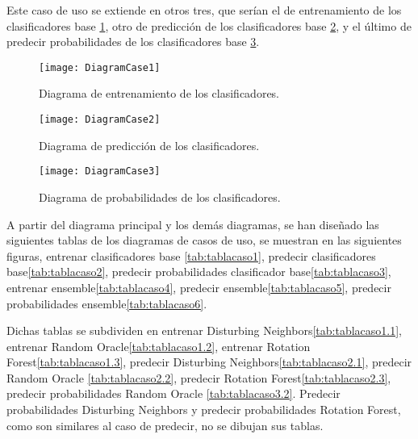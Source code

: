 Este caso de uso se extiende en otros tres, que serían el de entrenamiento de los clasificadores base \ref{fig:DiagramCase1}, otro de predicción de los clasificadores base \ref{fig:DiagramCase2}, y el último de predecir probabilidades de los clasificadores base \ref{fig:DiagramCase3}.	

\begin{figure}
\centering
\texttt{[image: DiagramCase1]}
\caption{Diagrama de entrenamiento de los clasificadores.}
\label{fig:DiagramCase1}
\end{figure}

\begin{figure}
\centering
\texttt{[image: DiagramCase2]}
\caption{Diagrama de predicción de los clasificadores.}
\label{fig:DiagramCase2}
\end{figure}

\begin{figure}
\centering
\texttt{[image: DiagramCase3]}
\caption{Diagrama de probabilidades de los clasificadores.}
\label{fig:DiagramCase3}
\end{figure}

A partir del diagrama principal y los demás diagramas, se han diseñado las siguientes tablas de los diagramas de casos de uso, se muestran en las siguientes figuras, entrenar clasificadores base \ref{tab:tablacaso1}, predecir clasificadores base\ref{tab:tablacaso2}, predecir probabilidades clasificador base\ref{tab:tablacaso3}, entrenar ensemble\ref{tab:tablacaso4}, predecir ensemble\ref{tab:tablacaso5}, predecir probabilidades ensemble\ref{tab:tablacaso6}. 

Dichas tablas se subdividen en entrenar Disturbing Neighbors\ref{tab:tablacaso1.1}, entrenar Random Oracle\ref{tab:tablacaso1.2}, entrenar Rotation Forest\ref{tab:tablacaso1.3}, predecir Disturbing Neighbors\ref{tab:tablacaso2.1}, predecir Random Oracle \ref{tab:tablacaso2.2}, predecir Rotation Forest\ref{tab:tablacaso2.3}, predecir probabilidades Random Oracle \ref{tab:tablacaso3.2}. Predecir probabilidades Disturbing Neighbors y predecir probabilidades Rotation Forest, como son similares al caso de predecir, no se dibujan sus tablas.

